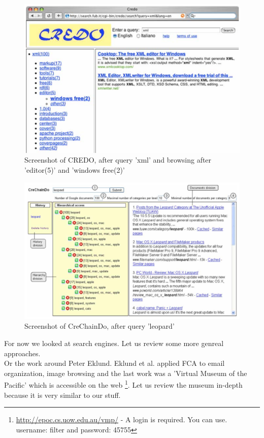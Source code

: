\documentclass[11pt]{report}
\begin{document}
\begin{figure}[h]
	\centering
	\includegraphics[width=\linewidth]{images/credo}
\caption{Screenshot of CREDO, after query 'xml' and browsing after 'editor(5)' and 'windows free(2)' \cite{Carpineto2004} }
\label{figure:credo}
\end{figure} 

\begin{figure}[h]
	\centering
	\includegraphics[width=\linewidth]{images/crechaindo}
\caption{Screenshot of CreChainDo, after query 'leopard' \cite{Nauer2009} }
\label{figure:crechaindo}
\end{figure} 

For now we looked at search engines. Let us review some more genreal approaches.\\


Or the work around Peter Eklund. Eklund et al. applied FCA to email organization\cite{Eklund2004}, image browsing \cite{Ducrou2006,Ducrou2008} and the last work was a 'Virtual Museum of the Pacific' \cite{Eklund2009,Eklund2012} which is accessible on the web \footnote{\url{http://epoc.cs.uow.edu.au/vmp/} - A login is required. You can use. username: filter and password: 45755}. Let us review the museum in-depth because it is very similar to our stuff. \\
 
\end{document}
